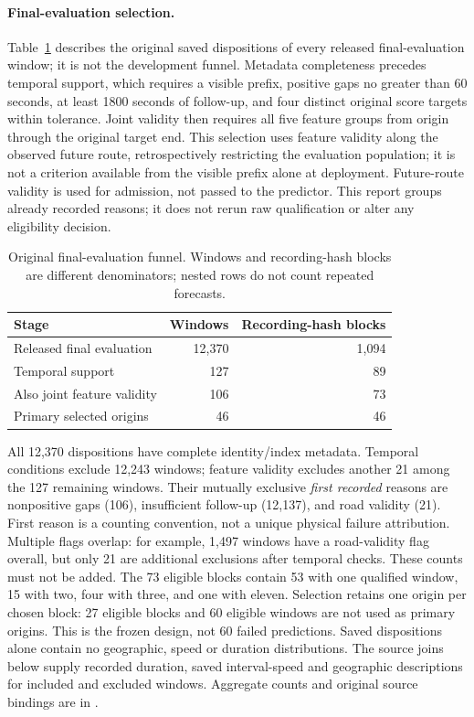 \documentclass[11pt]{article}
\begin{document}
\paragraph{Final-evaluation selection.}\label{sec:final-cohort-funnel}
Table~\ref{tab:final-cohort-funnel} describes the original saved dispositions
of every released final-evaluation window; it is not the development funnel.
Metadata completeness precedes temporal support, which requires a visible
prefix, positive gaps no greater than 60 seconds, at least 1800 seconds of
follow-up, and four distinct original score targets within tolerance.
Joint validity then requires all five feature groups from origin through
the original target end. This selection uses feature validity along the
observed future route, retrospectively restricting the evaluation population;
it is not a criterion available from the visible prefix alone at deployment.
Future-route validity is used for admission, not passed to the predictor.
This report groups already recorded reasons;
it does not rerun raw qualification or alter any eligibility decision.

\begin{table}[htbp]
\centering\small
\caption{Original final-evaluation funnel. Windows and recording-hash blocks
are different denominators; nested rows do not count repeated forecasts.}
\label{tab:final-cohort-funnel}
\begin{tabular}{@{}lrr@{}}
\toprule
Stage & Windows & Recording-hash blocks\\
\midrule
Released final evaluation & 12,370 & 1,094\\
Temporal support & 127 & 89\\
Also joint feature validity & 106 & 73\\
Primary selected origins & 46 & 46\\
\bottomrule
\end{tabular}
\end{table}
All 12,370 dispositions have complete identity/index metadata. Temporal
conditions exclude 12,243 windows; feature validity excludes another 21
among the 127 remaining windows. Their mutually exclusive \emph{first
recorded} reasons are nonpositive gaps (106), insufficient follow-up
(12,137), and road validity (21). First reason is a counting convention,
not a unique physical failure attribution. Multiple flags overlap: for
example, 1,497 windows have a road-validity flag overall, but only 21 are
additional exclusions after temporal checks. These counts must not be added.
The 73 eligible blocks contain 53 with one qualified window, 15 with two,
four with three, and one with eleven. Selection retains one origin per
chosen block: 27 eligible blocks and 60 eligible windows are not used as
primary origins. This is the frozen design, not 60 failed predictions.
Saved dispositions alone contain no geographic, speed or duration distributions.
The source joins below supply recorded duration, saved interval-speed and
geographic descriptions for included and excluded windows. Aggregate counts
and original source bindings are in .
\end{document}
